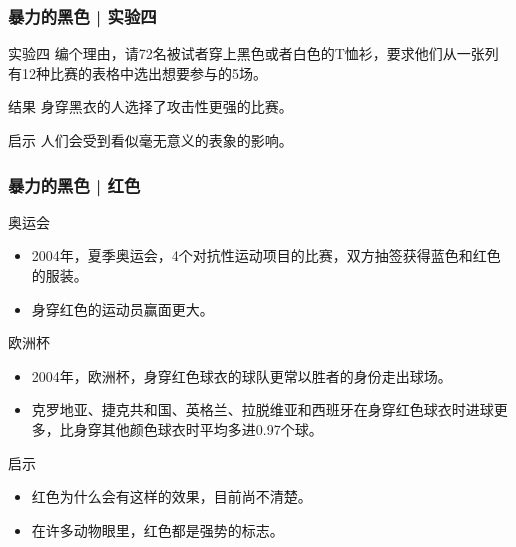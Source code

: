 \begin{frame}
  \frametitle{暴力的黑色 | 实验四}
  \begin{block}{实验四}
    编个理由，请72名被试者穿上黑色或者白色的T恤衫，要求他们从一张列有12种比赛的表格中选出想要参与的5场。
  \end{block}
  \pause
  \begin{block}{结果}
  身穿黑衣的人选择了攻击性更强的比赛。
  \end{block}
  \pause
  \begin{block}{启示}
    人们会受到看似毫无意义的表象的影响。
  \end{block}
\end{frame}

\begin{frame}
  \frametitle{暴力的黑色 | 红色}
  \begin{block}{奥运会}
    \begin{itemize}
      \item 2004年，夏季奥运会，4个对抗性运动项目的比赛，双方抽签获得蓝色和红色的服装。
      \item 身穿红色的运动员赢面更大。
    \end{itemize}
  \end{block}
  \pause
  \begin{block}{欧洲杯}
    \begin{itemize}
      \item 2004年，欧洲杯，身穿红色球衣的球队更常以胜者的身份走出球场。
      \item 克罗地亚、捷克共和国、英格兰、拉脱维亚和西班牙在身穿红色球衣时进球更多，比身穿其他颜色球衣时平均多进0.97个球。
    \end{itemize}
  \end{block}
  \pause
  \begin{block}{启示}
    \begin{itemize}
      \item 红色为什么会有这样的效果，目前尚不清楚。
      \item 在许多动物眼里，红色都是强势的标志。
    \end{itemize}
  \end{block}
\end{frame}

